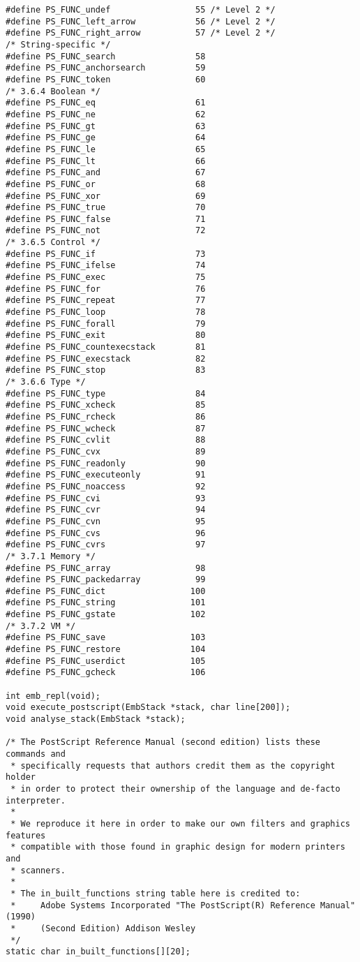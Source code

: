 \begin{lstlisting}
#define PS_FUNC_undef                 55 /* Level 2 */
#define PS_FUNC_left_arrow            56 /* Level 2 */
#define PS_FUNC_right_arrow           57 /* Level 2 */
/* String-specific */
#define PS_FUNC_search                58
#define PS_FUNC_anchorsearch          59
#define PS_FUNC_token                 60
/* 3.6.4 Boolean */
#define PS_FUNC_eq                    61
#define PS_FUNC_ne                    62
#define PS_FUNC_gt                    63
#define PS_FUNC_ge                    64
#define PS_FUNC_le                    65
#define PS_FUNC_lt                    66
#define PS_FUNC_and                   67
#define PS_FUNC_or                    68
#define PS_FUNC_xor                   69
#define PS_FUNC_true                  70
#define PS_FUNC_false                 71
#define PS_FUNC_not                   72
/* 3.6.5 Control */
#define PS_FUNC_if                    73
#define PS_FUNC_ifelse                74
#define PS_FUNC_exec                  75
#define PS_FUNC_for                   76
#define PS_FUNC_repeat                77
#define PS_FUNC_loop                  78
#define PS_FUNC_forall                79
#define PS_FUNC_exit                  80
#define PS_FUNC_countexecstack        81
#define PS_FUNC_execstack             82
#define PS_FUNC_stop                  83
/* 3.6.6 Type */
#define PS_FUNC_type                  84
#define PS_FUNC_xcheck                85
#define PS_FUNC_rcheck                86
#define PS_FUNC_wcheck                87
#define PS_FUNC_cvlit                 88
#define PS_FUNC_cvx                   89
#define PS_FUNC_readonly              90
#define PS_FUNC_executeonly           91
#define PS_FUNC_noaccess              92
#define PS_FUNC_cvi                   93
#define PS_FUNC_cvr                   94
#define PS_FUNC_cvn                   95
#define PS_FUNC_cvs                   96
#define PS_FUNC_cvrs                  97
/* 3.7.1 Memory */
#define PS_FUNC_array                 98
#define PS_FUNC_packedarray           99
#define PS_FUNC_dict                 100
#define PS_FUNC_string               101
#define PS_FUNC_gstate               102
/* 3.7.2 VM */
#define PS_FUNC_save                 103
#define PS_FUNC_restore              104
#define PS_FUNC_userdict             105
#define PS_FUNC_gcheck               106

int emb_repl(void);
void execute_postscript(EmbStack *stack, char line[200]);
void analyse_stack(EmbStack *stack);

/* The PostScript Reference Manual (second edition) lists these commands and
 * specifically requests that authors credit them as the copyright holder
 * in order to protect their ownership of the language and de-facto interpreter.
 *
 * We reproduce it here in order to make our own filters and graphics features
 * compatible with those found in graphic design for modern printers and
 * scanners.
 *
 * The in_built_functions string table here is credited to:
 *     Adobe Systems Incorporated "The PostScript(R) Reference Manual" (1990)
 *     (Second Edition) Addison Wesley
 */
static char in_built_functions[][20];


\end{lstlisting}
